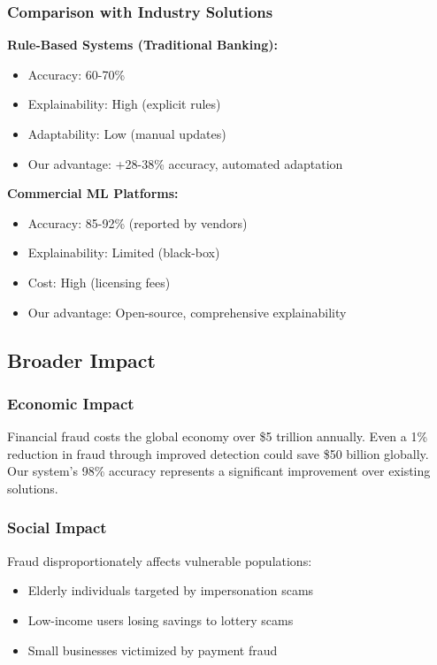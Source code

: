 \subsubsection{Comparison with Industry Solutions}

\textbf{Rule-Based Systems (Traditional Banking):}
\begin{itemize}
    \item Accuracy: 60-70\%
    \item Explainability: High (explicit rules)
    \item Adaptability: Low (manual updates)
    \item Our advantage: +28-38\% accuracy, automated adaptation
\end{itemize}

\textbf{Commercial ML Platforms:}
\begin{itemize}
    \item Accuracy: 85-92\% (reported by vendors)
    \item Explainability: Limited (black-box)
    \item Cost: High (licensing fees)
    \item Our advantage: Open-source, comprehensive explainability
\end{itemize}

\subsection{Broader Impact}

\subsubsection{Economic Impact}

Financial fraud costs the global economy over \$5 trillion annually. Even a 1\% reduction in fraud through improved detection could save \$50 billion globally. Our system's 98\% accuracy represents a significant improvement over existing solutions.

\subsubsection{Social Impact}

Fraud disproportionately affects vulnerable populations:
\begin{itemize}
    \item Elderly individuals targeted by impersonation scams
    \item Low-income users losing savings to lottery scams
    \item Small businesses victimized by payment fraud
\end{itemize}

